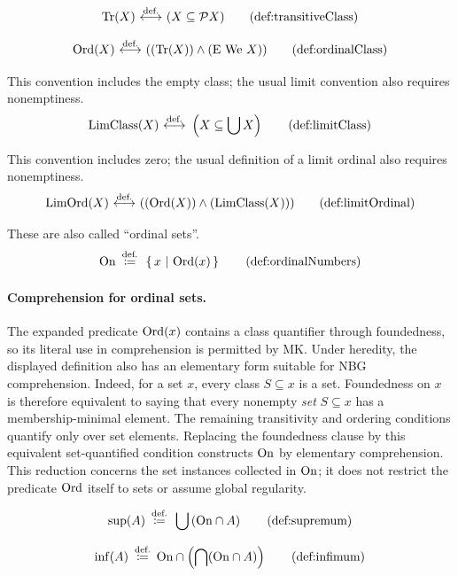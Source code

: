 \begin{definition}
\[
\Tr(X)
\iffdef
(X\subclass \power X)
\labeltagd{def}{transitiveClass}
\]
\end{definition}


\begin{definition}
\[
\Ord(X)
\iffdef
((\Tr(X))\land(\E\mathrm{\ We\ }X))
\labeltagd{def}{ordinalClass}
\]
\end{definition}
\begin{definition}
This convention includes the empty class; the usual limit convention also requires nonemptiness.
\[
\LimClass(X)
\iffdef
\left(X\subclass\union X\right)
\labeltagd{def}{limitClass}
\]
\end{definition}
\begin{definition}
This convention includes zero; the usual definition of a limit ordinal also requires nonemptiness.
\[
\LimOrd(X)
\iffdef
((\Ord(X))\land(\LimClass(X)))
\labeltagd{def}{limitOrdinal}
\]
\end{definition}

\begin{definition} These are also called ``ordinal sets''.
\[
\On\ \eqdef\ \cc{x}{\Ord(x)}
\labeltagd{def}{ordinalNumbers}
\]
\end{definition}
\paragraph{Comprehension for ordinal sets.}
The expanded predicate $\mathrm{Ord}(x)$ contains a class quantifier through
foundedness, so its literal use in comprehension is permitted by MK.
Under heredity, the displayed definition also has an elementary
form suitable for NBG comprehension. Indeed, for a set $x$, every
class $S\subseteq x$ is a set. Foundedness on $x$ is therefore
equivalent to saying that every nonempty \emph{set} $S\subseteq x$
has a membership-minimal element. The remaining transitivity and
ordering conditions quantify only over set elements. Replacing the
foundedness clause by this equivalent set-quantified condition constructs
$\mathrm{On}$ by elementary comprehension. This reduction concerns the set
instances collected in $\mathrm{On}$; it does not restrict the predicate
$\mathrm{Ord}$ itself to sets or assume global regularity.

\begin{definition}[supremum]
\[
\sup(A)\ \eqdef\ \bigcup\left(\On\cap A\right)
\labeltagd{def}{supremum}
\]
\end{definition}
\begin{definition}[infimum]
\[
\inf(A)\ \eqdef\ \On\cap\left(\bigcap (\On\cap A)\right)
\labeltagd{def}{infimum}
\]
\end{definition}

